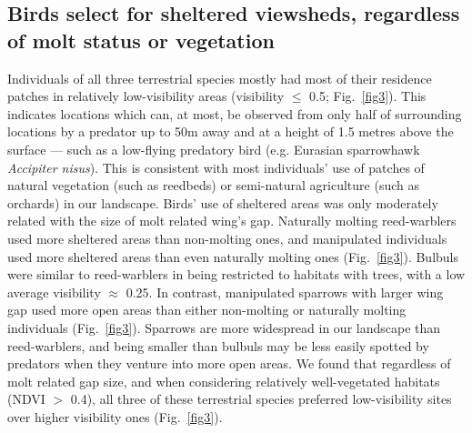 \subsection*{Birds select for sheltered viewsheds, regardless of molt status or vegetation}

Individuals of all three terrestrial species mostly had most of their residence patches in relatively low-visibility areas (visibility $\leq$ 0.5; Fig.~\ref{fig3}).
This indicates locations which can, at most, be observed from only half of surrounding locations by a predator up to 50m away and at a height of 1.5 metres above the surface --- such as a low-flying predatory bird (e.g. Eurasian sparrowhawk \textit{Accipiter nisus}).
This is consistent with most individuals' use of patches of natural vegetation (such as reedbeds) or semi-natural agriculture (such as orchards) in our landscape.
Birds' use of sheltered areas was only moderately related with the size of molt related wing's gap.
Naturally molting reed-warblers used more sheltered areas than non-molting ones, and manipulated individuals used more sheltered areas than even naturally molting ones (Fig.~\ref{fig3}).
Bulbuls were similar to reed-warblers in being restricted to habitats with trees, with a low average visibility $\approx$ 0.25.
In contrast, manipulated sparrows with larger wing gap used more open areas than either non-molting or naturally molting individuals (Fig.~\ref{fig3}).
Sparrows are more widespread in our landscape than reed-warblers, and being smaller than bulbuls may be less easily spotted by predators when they venture into more open areas.
We found that regardless of molt related gap size, and when considering relatively well-vegetated habitats (NDVI $>$ 0.4), all three of these terrestrial species preferred low-visibility sites over higher visibility ones (Fig.~\ref{fig3}).

